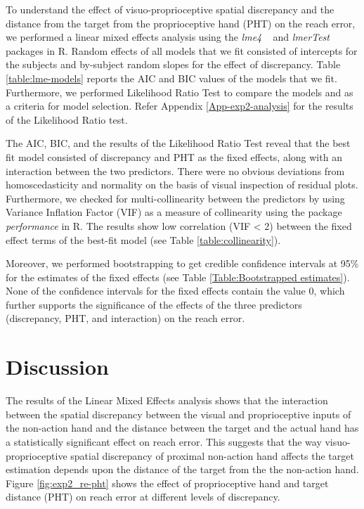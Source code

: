 To understand the effect of visuo-proprioceptive spatial discrepancy and the distance from the target from the proprioceptive hand (PHT) on the reach error, we performed a linear mixed effects analysis using the \emph{lme4} ~\citep{bates2014fitting} and \emph{lmerTest} packages in R. Random effects of all models that we fit consisted of intercepts for the subjects and by-subject random slopes for the effect of discrepancy. Table \ref{table:lme-models} reports the AIC and BIC values of the models that we fit. Furthermore, we performed Likelihood Ratio Test to compare the models and as a criteria for model selection. Refer Appendix \ref{App-exp2-analysis} for the results of the Likelihood Ratio test. 

The AIC, BIC, and the results of the Likelihood Ratio Test reveal that the best fit model consisted of discrepancy and PHT as the fixed effects, along with an interaction between the two predictors. There were no obvious deviations from homoscedasticity and normality on the basis of visual inspection of residual plots. Furthermore, we checked for multi-collinearity between the predictors by using Variance Inflation Factor (VIF) as a measure of collinearity using the package \emph{performance} in R. The results show low correlation (VIF < 2) between the fixed effect terms of the best-fit model (see Table \ref{table:collinearity}).

Moreover, we performed bootstrapping to get credible confidence intervals at 95\% for the estimates of the fixed effects (see Table \ref{Table:Bootstrapped estimates}). None of the confidence intervals for the fixed effects contain the value 0, which further supports the significance of the effects of the three predictors (discrepancy, PHT, and interaction) on the reach error. 


\section{Discussion}
The results of the Linear Mixed Effects analysis shows that the interaction between the spatial discrepancy between the visual and proprioceptive inputs of the non-action hand and the distance between the target and the actual hand has a statistically significant effect on reach error. This suggests that the way visuo-proprioceptive spatial discrepancy of proximal non-action hand affects the target estimation depends upon the distance of the target from the the non-action hand. Figure \ref{fig:exp2_re-pht} shows the effect of proprioceptive hand and target distance (PHT) on reach error at different levels of discrepancy.

